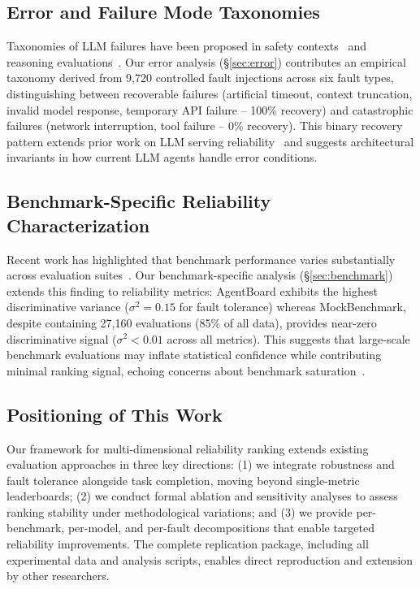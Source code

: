 \subsection{Error and Failure Mode Taxonomies}

Taxonomies of LLM failures have been proposed in safety contexts~\cite{weidinger2021harms, zhang2024failures} and reasoning evaluations~\cite{huang2024large}. Our error analysis (\S\ref{sec:error}) contributes an empirical taxonomy derived from 9,720 controlled fault injections across six fault types, distinguishing between recoverable failures (artificial timeout, context truncation, invalid model response, temporary API failure -- 100\% recovery) and catastrophic failures (network interruption, tool failure -- 0\% recovery). This binary recovery pattern extends prior work on LLM serving reliability~\cite{talebirad2023multi} and suggests architectural invariants in how current LLM agents handle error conditions.

\subsection{Benchmark-Specific Reliability Characterization}

Recent work has highlighted that benchmark performance varies substantially across evaluation suites~\cite{ye2024beyond, zhong2023agree}. Our benchmark-specific analysis (\S\ref{sec:benchmark}) extends this finding to reliability metrics: AgentBoard exhibits the highest discriminative variance ($\sigma^2 = 0.15$ for fault tolerance) whereas MockBenchmark, despite containing 27,160 evaluations (85\% of all data), provides near-zero discriminative signal ($\sigma^2 < 0.01$ across all metrics). This suggests that large-scale benchmark evaluations may inflate statistical confidence while contributing minimal ranking signal, echoing concerns about benchmark saturation~\cite{kshitij2021saturation}.

\subsection{Positioning of This Work}

Our framework for multi-dimensional reliability ranking extends existing evaluation approaches in three key directions: (1) we integrate robustness and fault tolerance alongside task completion, moving beyond single-metric leaderboards; (2) we conduct formal ablation and sensitivity analyses to assess ranking stability under methodological variations; and (3) we provide per-benchmark, per-model, and per-fault decompositions that enable targeted reliability improvements. The complete replication package, including all experimental data and analysis scripts, enables direct reproduction and extension by other researchers.
